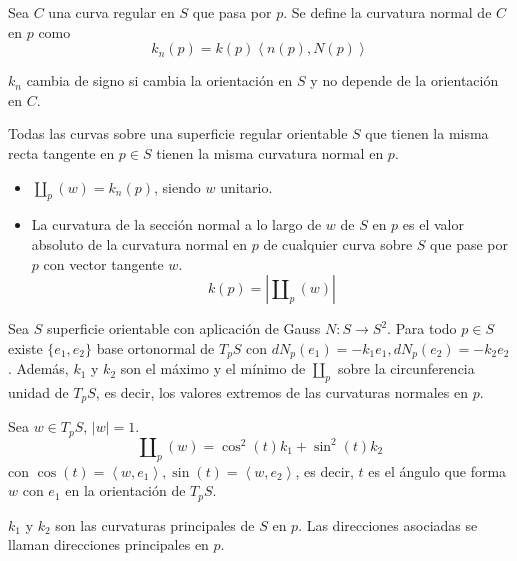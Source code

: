 \begin{definition}
    Sea $C$ una curva regular en $S$ que pasa por $p$.
    Se define la curvatura normal de $C$ en $p$ como
    $$k_n(p) = k(p) \left\langle n(p), N(p) \right\rangle$$
\end{definition}

\begin{remark}
    $k_n$ cambia de signo si cambia la orientación en $S$ y no depende de la orientación en $C$.
\end{remark}

\begin{theorem}
    Todas las curvas sobre una superficie regular orientable $S$ que tienen la misma recta tangente en $p \in S$ tienen la misma curvatura normal en $p$.
\end{theorem}

\begin{remark}
    \hfill
    \begin{itemize}
        \item $\amalg_p(w) = k_n(p)$, siendo $w$ unitario.
        \item La curvatura de la sección normal a lo largo de $w$ de $S$ en $p$ es el valor absoluto de la curvatura normal en $p$ de cualquier curva sobre $S$ que pase por $p$ con vector tangente $w$.
              $$k(p) = |\amalg_p(w)|$$
    \end{itemize}
\end{remark}

\begin{theorem}
    Sea $S$ superficie orientable con aplicación de Gauss $N : S \to S^2$.
    Para todo $p \in S$ existe $\{e_1, e_2\}$ base ortonormal de $T_pS$ con $dN_p(e_1) = -k_1e_1, dN_p(e_2) = -k_2e_2$.
    Además, $k_1$ y $k_2$ son el máximo y el mínimo de $\amalg_p$ sobre la circunferencia unidad de $T_pS$, es decir, los valores extremos de las curvaturas normales en $p$.
\end{theorem}

\begin{theorem}
    Sea $w \in T_pS$, $|w| = 1$.
    $$\amalg_p(w) = \cos^2(t) k_1 + \sin^2(t) k_2$$
    con $\cos(t) = \left\langle w, e_1 \right\rangle, \sin(t) = \left\langle w, e_2 \right\rangle$, es decir, $t$ es el ángulo que forma $w$ con $e_1$ en la orientación de $T_pS$.
\end{theorem}

\begin{definition}
    $k_1$ y $k_2$ son las curvaturas principales de $S$ en $p$.
    Las direcciones asociadas se llaman direcciones principales en $p$.
\end{definition}

